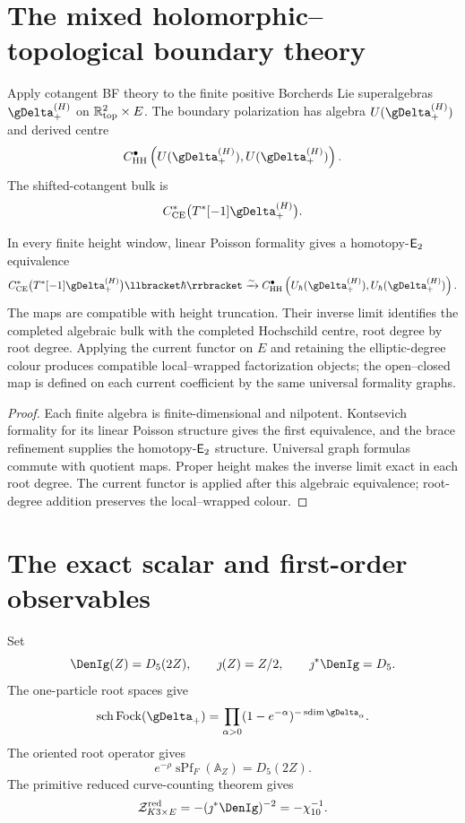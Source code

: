 \chapter{The mixed holomorphic--topological boundary theory}
Apply cotangent BF theory to the finite positive Borcherds Lie superalgebras $\gDelta_+^{(H)}$ on $\mathbb R^2_{\mathrm{top}}\times E$.  The boundary polarization has algebra $U(\gDelta_+^{(H)})$ and derived centre
\[
 C^\bullet_{\HH}
 \left(U(\gDelta_+^{(H)}),U(\gDelta_+^{(H)})\right).
\]
The shifted-cotangent bulk is
\[
 C^*_{\CE}\bigl(T^*[-1]\gDelta_+^{(H)}\bigr).
\]

\begin{theorem}
In every finite height window, linear Poisson formality gives a homotopy-$\mathsf E_2$ equivalence
\[
 C^*_{\CE}\bigl(T^*[-1]\gDelta_+^{(H)}\bigr)\llbracket\hbarq\rrbracket
 \xrightarrow{\sim}
 C^\bullet_{\HH}
 \left(U_\hbar(\gDelta_+^{(H)}),U_\hbar(\gDelta_+^{(H)})\right).
\]
The maps are compatible with height truncation.  Their inverse limit identifies the completed algebraic bulk with the completed Hochschild centre, root degree by root degree.  Applying the current functor on $E$ and retaining the elliptic-degree colour produces compatible local--wrapped factorization objects; the open--closed map is defined on each current coefficient by the same universal formality graphs.
\end{theorem}
\begin{proof}
Each finite algebra is finite-dimensional and nilpotent.  Kontsevich formality for its linear Poisson structure gives the first equivalence, and the brace refinement supplies the homotopy-$\mathsf E_2$ structure.  Universal graph formulas commute with quotient maps.  Proper height makes the inverse limit exact in each root degree.  The current functor is applied after this algebraic equivalence; root-degree addition preserves the local--wrapped colour.
\end{proof}

\chapter{The exact scalar and first-order observables}
Set
\[
 \DenIg(Z)=D_5(2Z),
 \qquad \jmath(Z)=Z/2,
 \qquad \jmath^*\DenIg=D_5.
\]
The one-particle root spaces give
\[
 \sch\Fock(\gDelta_+)
 =\prod_{\alpha>0}(1-e^{-\alpha})^{-\sdim\gDelta_\alpha}.
\]
The oriented root operator gives
\[
 e^{-\rho}\operatorname{sPf}_F(\mathbb A_Z)=D_5(2Z).
\]
The primitive reduced curve-counting theorem gives
\[
 \mathcal Z^{\red}_{K3\times E}=-(\jmath^*\DenIg)^{-2}=-\chi_{10}^{-1}.
\]

